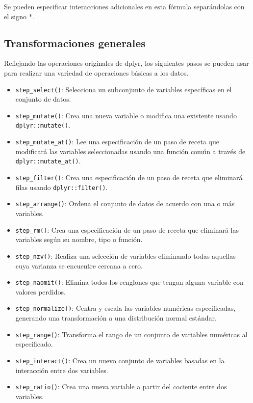 \documentclass[
]{book}
\begin{document}
Se pueden especificar interacciones adicionales en esta fórmula separándolas con el signo \(*\).

\hypertarget{transformaciones-generales}{%
\subsection{Transformaciones generales}\label{transformaciones-generales}}

Reflejando las operaciones originales de dplyr, los siguientes pasos se pueden usar para realizar una variedad de operaciones básicas a los datos.

\begin{itemize}
\item
  \texttt{step\_select()}: Selecciona un subconjunto de variables específicas en el conjunto de datos.
\item
  \texttt{step\_mutate()}: Crea una nueva variable o modifica una existente usando \texttt{dplyr::mutate()}.
\item
  \texttt{step\_mutate\_at()}: Lee una especificación de un paso de receta que modificará las variables seleccionadas usando una función común a través de \texttt{dplyr::mutate\_at()}.
\item
  \texttt{step\_filter()}: Crea una especificación de un paso de receta que eliminará
  filas usando \texttt{dplyr::filter()}.
\item
  \texttt{step\_arrange()}: Ordena el conjunto de datos de acuerdo con una o más variables.
\item
  \texttt{step\_rm()}: Crea una especificación de un paso de receta que eliminará las
  variables según su nombre, tipo o función.
\item
  \texttt{step\_nzv()}: Realiza una selección de variables eliminando todas aquellas cuya varianza se encuentre cercana a cero.
\item
  \texttt{step\_naomit()}: Elimina todos los renglones que tengan alguna variable con valores perdidos.
\item
  \texttt{step\_normalize()}: Centra y escala las variables numéricas especificadas, generando una transformación a una distribución normal estándar.
\item
  \texttt{step\_range()}: Transforma el rango de un conjunto de variables numéricas al especificado.
\item
  \texttt{step\_interact()}: Crea un nuevo conjunto de variables basadas en la interacción entre dos variables.
\item
  \texttt{step\_ratio()}: Crea una nueva variable a partir del cociente entre dos variables.

\end{itemize}
\end{document}
